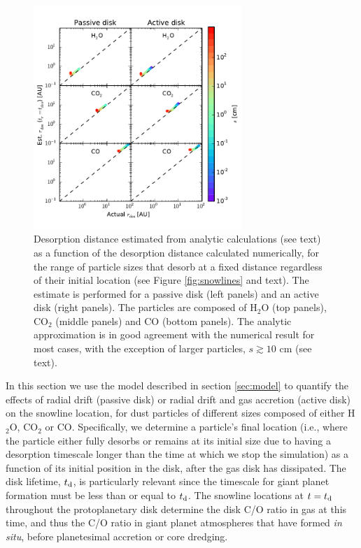 \documentclass[apj]{emulateapj}
\begin{document}
\begin{figure}[t!]
\centering
\includegraphics[width=0.7\textwidth]{desorption_distance_actual_vs_estimated_passive_active_new.pdf}
\caption{Desorption distance estimated from analytic calculations (see text) as a function of the desorption distance calculated numerically, for the range of particle sizes that desorb at a fixed distance regardless of their initial location (see Figure \ref{fig:snowlines} and text). The estimate is performed for a passive disk (left panels) and an active disk (right panels).  The particles are composed of H$_2$O (top panels), CO$_2$ (middle panels) and CO (bottom panels). The analytic approximation is in good agreement with the numerical result for most cases, with the exception of larger particles, $s \gtrsim 10$ cm (see text).}
\label{fig:an_vs_actual}
\end{figure}

In this section we use the model described in section \ref{sec:model} to quantify the effects of radial drift (passive disk) or radial drift and gas accretion (active disk) on the snowline location, for dust particles of different sizes composed of either H$_2$O, CO$_2$ or CO. Specifically, we determine a particle's final location (i.e., where the particle either fully desorbs or remains at its initial size due to having a desorption timescale longer than the time at which we stop the simulation) as a function of its initial position in the disk, after the gas disk has dissipated. The disk lifetime, $t_{\rm d}$, is particularly relevant since the timescale for giant planet formation must be less than or equal to $t_{\rm d}$. The snowline locations at $t=t_{\rm d}$ throughout the protoplanetary disk determine the disk C/O ratio in gas at this time, and thus the C/O ratio in giant planet atmospheres that have formed \textit{in situ}, before planetesimal accretion or core dredging.   
\end{document}
